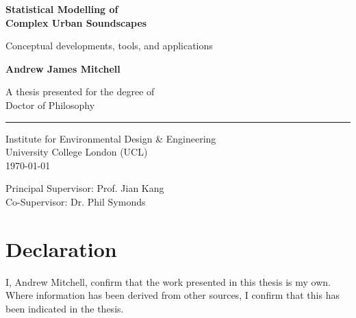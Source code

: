 \documentclass[twoside,fontsize=12pt,titlepage,chapterprefix=true
]{scrbook}
\begin{document}
\frontmatter
{}
\begin{titlepage}
      \AddToShipoutPicture*{}
      \begin{center}
            \vspace*{3cm}

            \Huge
            \textbf{Statistical Modelling of\\Complex Urban Soundscapes}

            \vspace{0.5cm}
            \LARGE
            Conceptual developments, tools, and applications

            \vspace{1.5cm}

            \textbf{Andrew James Mitchell}

            \vfill
            A thesis presented for the degree of\\
            Doctor of Philosophy\\
            \rule[-.5cm]{0.5\textwidth}{1pt}

            \vspace{1.5cm}

            \Large
            Institute for Environmental Design \& Engineering\\
            University College London (UCL)\\
            \today

            \vspace{1cm}

            Principal Supervisor: Prof. Jian Kang\\
            Co-Supervisor: Dr. Phil Symonds

      \end{center}
\end{titlepage}


\restoregeometry


\chapter*{Declaration}
I, Andrew Mitchell, confirm that the work presented in this thesis is my own. Where information has been derived from other sources, I confirm that this has been indicated in the thesis.
\end{document}
